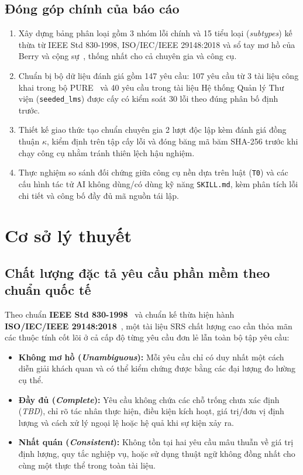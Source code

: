 \documentclass[12pt,a4paper]{report}
\begin{document}
\section{Đóng góp chính của báo cáo}
\begin{enumerate}
  \item Xây dựng bảng phân loại gồm 3 nhóm lỗi chính và 15 tiểu loại (\textit{subtypes}) kế thừa từ IEEE Std 830-1998, ISO/IEC/IEEE 29148:2018 và sổ tay mơ hồ của Berry và cộng sự~\cite{berry2003}, thống nhất cho cả chuyên gia và công cụ.
  \item Chuẩn bị bộ dữ liệu đánh giá gồm 147 yêu cầu: 107 yêu cầu từ 3 tài liệu công khai trong bộ PURE~\cite{ferrari2017} và 40 yêu cầu trong tài liệu Hệ thống Quản lý Thư viện (\texttt{seeded\_lms}) được cấy có kiểm soát 30 lỗi theo đúng phân bố định trước.
  \item Thiết kế giao thức tạo chuẩn chuyên gia 2 lượt độc lập kèm đánh giá đồng thuận $\kappa$, kiểm định trên tập cấy lỗi và đóng băng mã băm SHA-256 trước khi chạy công cụ nhằm tránh thiên lệch hậu nghiệm.
  \item Thực nghiệm so sánh đối chứng giữa công cụ nền dựa trên luật (\texttt{T0}) và các cấu hình tác tử AI không dùng/có dùng kỹ năng \texttt{SKILL.md}, kèm phân tích lỗi chi tiết và công bố đầy đủ mã nguồn tái lập.
\end{enumerate}

\chapter{Cơ sở lý thuyết}

\section{Chất lượng đặc tả yêu cầu phần mềm theo chuẩn quốc tế}
Theo chuẩn \textbf{IEEE Std 830-1998}~\cite{ieee830} và chuẩn kế thừa hiện hành \textbf{ISO/IEC/IEEE 29148:2018}~\cite{iso29148}, một tài liệu SRS chất lượng cao cần thỏa mãn các thuộc tính cốt lõi ở cả cấp độ từng yêu cầu đơn lẻ lẫn toàn bộ tập yêu cầu:
\begin{itemize}
  \item \textbf{Không mơ hồ (\textit{Unambiguous}):} Mỗi yêu cầu chỉ có duy nhất một cách diễn giải khách quan và có thể kiểm chứng được bằng các đại lượng đo lường cụ thể.
  \item \textbf{Đầy đủ (\textit{Complete}):} Yêu cầu không chứa các chỗ trống chưa xác định (\textit{TBD}), chỉ rõ tác nhân thực hiện, điều kiện kích hoạt, giá trị/đơn vị định lượng và cách xử lý ngoại lệ hoặc hệ quả khi sự kiện xảy ra.
  \item \textbf{Nhất quán (\textit{Consistent}):} Không tồn tại hai yêu cầu mâu thuẫn về giá trị định lượng, quy tắc nghiệp vụ, hoặc sử dụng thuật ngữ không đồng nhất cho cùng một thực thể trong toàn tài liệu.
\end{itemize}
\end{document}

